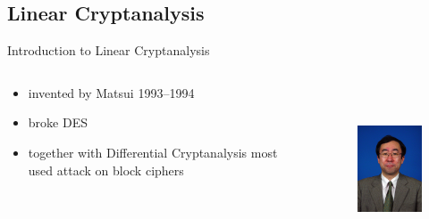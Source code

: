 \subsection{Linear Cryptanalysis}
\begin{frame}{Introduction to Linear Cryptanalysis}
	\begin{columns}[T]
		\begin{column}{.58\textwidth}
			\begin{itemize}
				\item invented by Matsui 1993--1994
				\item broke DES
				\item together with Differential Cryptanalysis
						most used attack on block ciphers
			\end{itemize}
		\end{column}
		\hfill
		\begin{column}{.38\textwidth}
			\begin{figure}[!ht]
				\includegraphics[height=50mm]{data/matsui.jpg}
			\end{figure}
		\end{column}
	\end{columns}
\end{frame}

